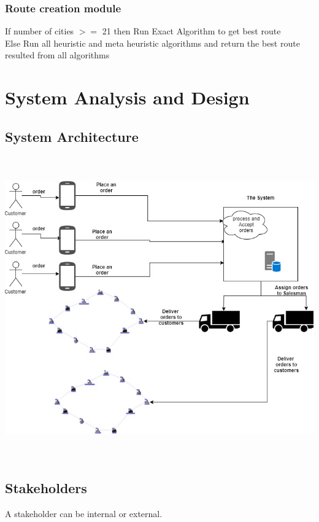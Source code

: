 \documentclass[12pt]{article}
\begin{document}
\subsubsection{Route creation module}
  If number of cities $>=$ 21 then 
  	Run Exact Algorithm to get best route\\
  Else
        Run all heuristic and meta heuristic 
        algorithms and return the best route resulted
         from all algorithms

\section{\sc System Analysis and Design}

\subsection{ System Architecture }
\begin{center}
	\includegraphics[width=16cm,height=13cm]{./assets/systemarchitecture/system-architecture.png}\\
\end{center}
\newpage

\subsection{ Stakeholders }
A stakeholder can be internal or external. 
\end{document}
